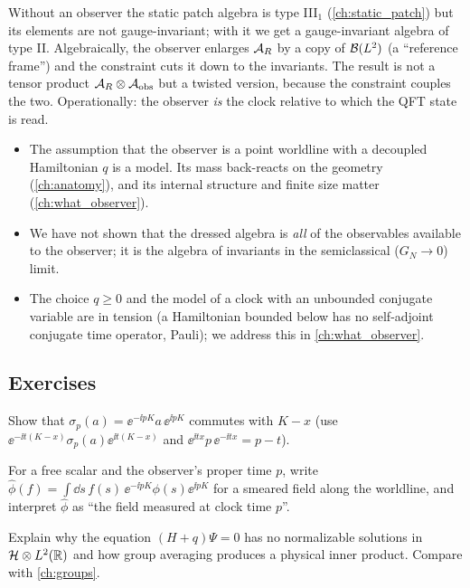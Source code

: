Without an observer the static patch algebra is type III$_1$ (\cref{ch:static_patch}) but its elements are not gauge-invariant; with it we get a gauge-invariant algebra of type II. Algebraically, the observer enlarges $\mathcal{A}_R$ by a copy of $\mathcal{B}(L^2)$ (a ``reference frame'') and the constraint cuts it down to the invariants. The result is not a tensor product $\mathcal{A}_R\otimes\mathcal{A}_{\rm obs}$ but a twisted version, because the constraint couples the two. Operationally: the observer \emph{is} the clock relative to which the QFT state is read.

\begin{whatwrong}
\begin{itemize}
\item The assumption that the observer is a point worldline with a decoupled Hamiltonian $q$ is a model. Its mass back-reacts on the geometry (\cref{ch:anatomy}), and its internal structure and finite size matter (\cref{ch:what_observer}).
\item We have not shown that the dressed algebra is \emph{all} of the observables available to the observer; it is the algebra of invariants in the semiclassical ($G_N\to0$) limit.
\item The choice $q\ge0$ and the model of a clock with an unbounded conjugate variable are in tension (a Hamiltonian bounded below has no self-adjoint conjugate time operator, Pauli); we address this in \cref{ch:what_observer}.
\end{itemize}
\end{whatwrong}

\subsection*{Exercises}
\begin{exercise}\label{ex:add_observer:1}
Show that $\sigma_p(a)=\ee^{-\ii pK}a\,\ee^{\ii pK}$ commutes with $K-x$ (use $\ee^{-\ii t(K-x)}\sigma_p(a)\ee^{\ii t(K-x)}$ and $\ee^{\ii tx}p\,\ee^{-\ii tx}=p-t$).
\end{exercise}
\begin{exercise}\label{ex:add_observer:2}
For a free scalar and the observer's proper time $p$, write $\hat\phi(f)=\int\dd s\,f(s)\,\ee^{-\ii pK}\phi(s)\ee^{\ii pK}$ for a smeared field along the worldline, and interpret $\hat\phi$ as ``the field measured at clock time $p$''.
\end{exercise}
\begin{exercise}\label{ex:add_observer:3}
Explain why the equation $(H+q)\Psi=0$ has no normalizable solutions in $\mathcal{H}\otimes L^2(\mathbb{R})$ and how group averaging produces a physical inner product. Compare with \cref{ch:groups}.
\end{exercise}

